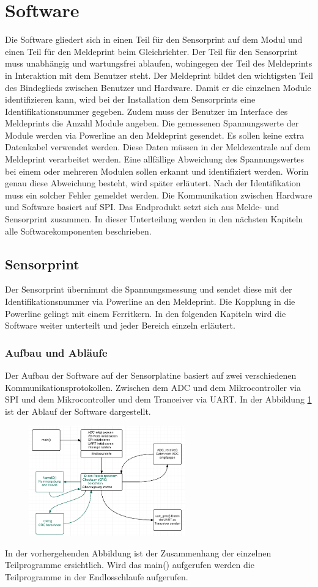 \section{Software}
Die Software gliedert sich in einen Teil für den Sensorprint auf dem Modul und einen Teil für den Meldeprint beim Gleichrichter. Der Teil für den Sensorprint muss unabhängig und wartungsfrei ablaufen, wohingegen der Teil des Meldeprints in Interaktion mit dem Benutzer steht. Der Meldeprint bildet den wichtigsten Teil des Bindeglieds zwischen Benutzer und Hardware. Damit er die einzelnen Module identifizieren kann, wird bei der Installation dem Sensorprints eine Identifikationsnummer gegeben. Zudem muss der Benutzer im Interface des Meldeprints die Anzahl Module angeben. Die gemessenen Spannungswerte der Module werden via Powerline an den Meldeprint gesendet. Es sollen keine extra Datenkabel verwendet werden. Diese Daten müssen in der Meldezentrale auf dem Meldeprint verarbeitet werden. Eine allfällige Abweichung des Spannungswertes bei einem oder mehreren Modulen sollen erkannt und identifiziert werden. Worin genau diese Abweichung besteht, wird später erläutert. Nach der Identifikation muss ein solcher Fehler gemeldet werden. Die Kommunikation zwischen Hardware und Software basiert auf SPI. Das Endprodukt setzt sich aus Melde- und Sensorprint zusammen. In dieser Unterteilung werden in den nächsten Kapiteln alle Softwarekomponenten beschrieben.


\subsection{Sensorprint}
Der Sensorprint übernimmt die Spannungsmessung und sendet diese mit der Identifikationsnummer via Powerline an den Meldeprint. Die Kopplung in die Powerline gelingt mit einem Ferritkern. In den folgenden Kapiteln wird die Software weiter unterteilt und jeder Bereich einzeln erläutert.
\subsubsection{Aufbau und Abläufe}
Der Aufbau der Software auf der Sensorplatine basiert auf zwei verschiedenen Kommunikationsprotokollen. Zwischen dem ADC und dem Mikrocontroller via SPI und dem Mikrocontroller und dem Tranceiver via UART. In der Abbildung \ref{DiagrammSP} ist der Ablauf der Software dargestellt.
\begin{figure}
\centering
\includegraphics[width=0.6\textwidth]{data/Sensorplatine}
\label{DiagrammSP}
\end{figure}
In der vorhergehenden Abbildung ist der Zusammenhang der einzelnen Teilprogramme ersichtlich. Wird das main() aufgerufen werden die Teilprogramme in der Endlosschlaufe aufgerufen.
